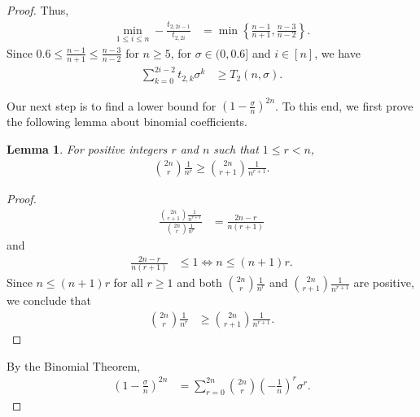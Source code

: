 \documentclass{article}
\theoremstyle{plain}
\newtheorem{lemma}[theorem]{Lemma}
\theoremstyle{definition}
\theoremstyle{remark}
\def\bigopen#1{\left(#1\right)}
\def\bigset#1{\left\{#1\right\}}
\begin{document}
\begin{proof}
Thus, 
\begin{align}
    \label{eq:t2intersection}
    \min_{1\le i\le n} -\frac{t_{2,2i-1}}{t_{2,2i}} &= \min \bigset{\frac{n-1}{n+1}, \frac{n-3}{n-2}}.
\end{align}
Since $0.6 \le \frac{n-1}{n+1} \le \frac{n-3}{n-2}$ for $n \ge 5$, for $\sigma\in (0, 0.6]$ and $i\in [n]$, we have 
\begin{align}
    \sum_{k=0}^{2i-2} t_{2,k}\sigma^k &\ge T_2(n, \sigma). \label{eq:t2ub}
\end{align}

Our next step is to find a lower bound for $\bigopen{1-\frac{\sigma}{n}}^{2n}$. To this end, we first prove the following lemma about binomial coefficients.
\begin{lemma}
    \label{lem:binom}
    For positive integers $r$ and $n$ such that $1\le r < n$,
    \begin{align*}
        \binom{2n}{r}\frac{1}{n^r} \ge \binom{2n}{r+1}\frac{1}{n^{r+1}}.
    \end{align*}
\end{lemma}
\begin{proof}
    \begin{align*}
        \frac{\binom{2n}{r+1}\frac{1}{n^{r+1}}}{\binom{2n}{r}\frac{1}{n^r}} &= \frac{2n-r}{n(r+1)}
    \end{align*}
    and 
    \begin{align*}
        \frac{2n-r}{n(r+1)} &\le 1 \iff n\le (n+1)r.
    \end{align*}
    Since $n\le (n+1)r$ for all $r \ge 1$ and both $\binom{2n}{r}\frac{1}{n^r}$ and $\binom{2n}{r+1}\frac{1}{n^{r+1}}$ are positive, we conclude that 
    \begin{align*}
        \binom{2n}{r}\frac{1}{n^r} &\ge \binom{2n}{r+1}\frac{1}{n^{r+1}}.
    \end{align*}
\end{proof}

By the Binomial Theorem,
\begin{align*}
    \bigopen{ 1-\frac{\sigma}{n} }^{2n} &= \sum_{r=0}^{2n} \binom{2n}{r}\bigopen{ -\frac{1}{n} }^r \sigma^r.
\end{align*}


\end{proof}
\end{document}
